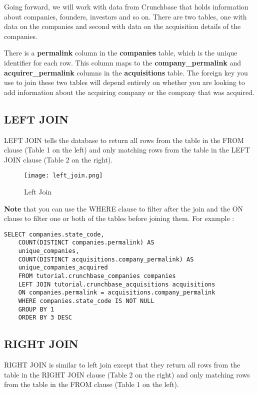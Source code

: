 \documentclass[12pt, letterpaper]{article}
\begin{document}
Going forward, we will work with data from Crunchbase that holds information about companies, founders, investors and so on. There are two tables, one with data on the companies and second with data on the acquisition details of the companies.

There is a \textbf{permalink} column in the \textbf{companies} table, which is the unique identifier for each row. This column maps to the \textbf{company\_permalink} and \textbf{acquirer\_permalink} columns in the \textbf{acquisitions} table. The foreign key you use to join these two tables will depend entirely on whether you are looking to add information about the acquiring company or the company that was acquired.


\subsection{LEFT JOIN}
LEFT JOIN tells the database to return all rows from the table in the FROM clause (Table 1 on the left) and only matching rows from the table in the LEFT JOIN clause (Table 2 on the right).

\begin{figure}[H]
    \centering
    \texttt{[image: left\_join.png]}
    \caption{Left Join}
    \label{leftjoin}
\end{figure}

\textbf{Note} that you can use the WHERE clause to filter after the join and the ON clause to filter one or both of the tables before joining them. For example : 

\begin{verbatim}
SELECT companies.state_code,
    COUNT(DISTINCT companies.permalink) AS
    unique_companies,
    COUNT(DISTINCT acquisitions.company_permalink) AS 
    unique_companies_acquired
    FROM tutorial.crunchbase_companies companies
    LEFT JOIN tutorial.crunchbase_acquisitions acquisitions
    ON companies.permalink = acquisitions.company_permalink
    WHERE companies.state_code IS NOT NULL
    GROUP BY 1
    ORDER BY 3 DESC
\end{verbatim}

\subsection{RIGHT JOIN}
RIGHT JOIN is similar to left join except that they return all rows from the table in the RIGHT JOIN clause (Table 2 on the right) and only matching rows from the table in the FROM clause (Table 1 on the left).
\end{document}
